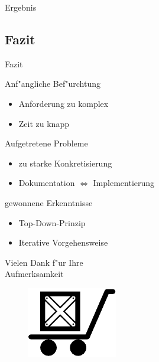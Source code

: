 \begin{frame}{Ergebnis}
 \begin{overlayarea}{\textwidth}{.33\textheight}
 \centering
 \end{overlayarea}

\end{frame}
\subsection{Fazit}
\begin{frame}[<+->]{Fazit}
\begin{block}{Anf"angliche Bef"urchtung}
\begin{itemize}
\item{Anforderung zu komplex}
\item{Zeit zu knapp}
\end{itemize}
\end{block}
\begin{block}{Aufgetretene Probleme}
\begin{itemize}
\item{zu starke Konkretisierung}
\item{Dokumentation $\Leftrightarrow$ Implementierung}
\end{itemize}
\end{block}
\begin{block}{gewonnene Erkenntnisse}
\begin{itemize}
\item{Top-Down-Prinzip}
\item{Iterative Vorgehensweise}
\end{itemize}
\end{block}
\end{frame}

\begin{frame}{}
\begin{center}
\huge{Vielen Dank f"ur Ihre\\Aufmerksamkeit}\\
\begin{figure}[b!]
\includegraphics{images/platform11}
\end{figure}
\end{center}
\end{frame}



